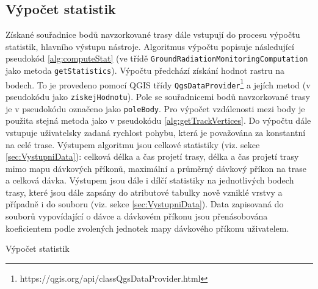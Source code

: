 \subsection{Výpočet statistik}
\label{subsec:vypocetStatistik}
Získané souřadnice bodů navzorkované trasy dále vstupují do procesu výpočtu statistik, hlavního výstupu nástroje. Algoritmus výpočtu popisuje následující pseudokód \ref{alg:computeStat} (ve třídě \texttt{GroundRadiationMonitoringComputation} jako metoda \texttt{getStatistics}). Výpočtu předchází získání hodnot rastru na bodech. To je provedeno pomocí QGIS třídy \texttt{QgsDataProvider}\footnote{https://qgis.org/api/classQgsDataProvider.html} a jejích metod (v pseudokódu jako \texttt{získejHodnotu}). Pole se souřadnicemi bodů navzorkované trasy je v pseudokódu označeno jako \texttt{poleBody}. Pro výpočet vzdálenosti mezi body je použita stejná metoda jako v pseudokódu \ref{alg:getTrackVertices}. Do výpočtu dále vstupuje uživatelsky zadaná rychlost pohybu, která je považována za konstantní na celé trase. Výstupem algoritmu jsou celkové statistiky (viz. sekce \ref{sec:VystupniData}): celková délka a čas projetí trasy, délka  a čas projetí trasy mimo mapu dávkových příkonů, maximální a průměrný dávkový příkon na trase a celková dávka. Výstupem jsou dále i dílčí statistiky na jednotlivých bodech trasy, které jsou dále zapsány do atributové tabulky nově vzniklé vrstvy a případně i do  souboru (viz. sekce \ref{sec:VystupniData}). Data zapisovaná do souborů vypovídající o dávce a dávkovém příkonu jsou přenásobována koeficientem podle zvolených jednotek mapy dávkového příkonu uživatelem. 


\begin{algorithm}
\caption{Výpočet statistik}
\label{alg:computeStat}
	\begin{algorithmic}[1]

			\ELSE
			\ENDIF
			


		\end{algorithmic}
		\end{algorithm}

